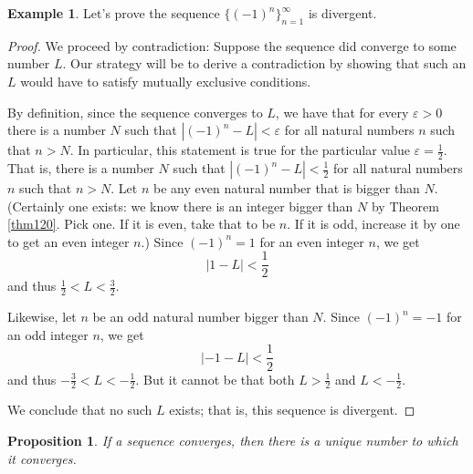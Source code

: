 \documentclass[12pt]{amsart}
\def\e{\varepsilon}
\numberwithin{equation}{section}
\theoremstyle{plain} %
\newtheorem{prop}[equation]{Proposition}
\theoremstyle{definition}
\newtheorem{ex}[equation]{Example}
\theoremstyle{remark}
\begin{document}
\begin{ex} Let's prove the sequence $\{(-1)^n\}_{n=1}^\infty$ is divergent.

\begin{proof}
  We proceed by contradiction: Suppose the sequence did converge to some number $L$. Our strategy will be to derive a contradiction by showing that such
  an $L$ would have to satisfy mutually exclusive conditions. 

By definition, since the sequence converges to $L$, we have that 
for every $\e > 0$ there is a number $N$ such that 
$|(-1)^n - L| < \e$
for all natural numbers $n$ such that $n > N$.
In particular, this statement is true for the particular value $\e = \frac12$. That is,  there is a number $N$ such that  
$|(-1)^n - L| < \frac12$ for all natural numbers $n$ such that  
$n > N$. Let $n$ be any even natural number that is bigger than
$N$. (Certainly one exists: we know there is an integer bigger than
$N$
by Theorem \ref{thm120}. Pick one. If it is even, take that to be
$n$. If it is odd, increase it by one to get an even integer $n$.)  Since $(-1)^n = 1$ for an even integer $n$, we get
$$
|1 - L| < \frac12
$$
and thus $\frac12 < L < \frac32$.

Likewise, let $n$ be an odd natural number bigger than $N$. Since $(-1)^n = -1$ for an odd integer $n$, we get
$$
|-1 - L| < \frac12
$$
and thus $-\frac32 < L < -\frac12$. But it cannot be that both $L > \frac12$ and $L < -\frac12$.

We conclude that no such $L$ exists; that is, this sequence is divergent.
\end{proof}
\end{ex}


\begin{prop} If a sequence converges, then there is a unique number to which it converges.
\end{prop}
\end{document}
